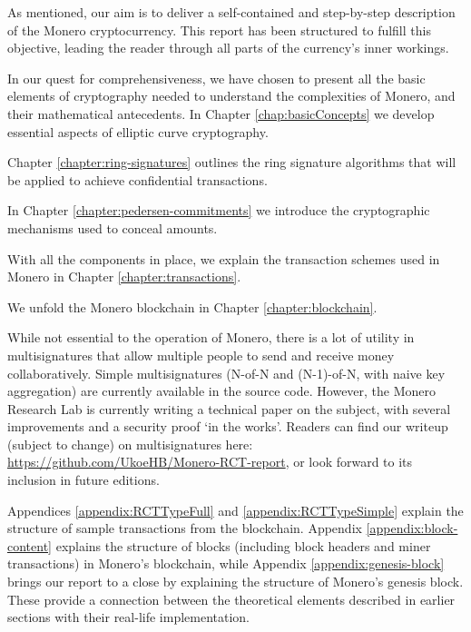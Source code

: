 As mentioned, our aim is to deliver a self-contained and step-by-step description of the Monero cryptocurrency. This report has been structured to fulfill this objective, leading the reader through all parts of the currency’s inner workings.

In our quest for comprehensiveness, we have chosen to present all the basic elements of cryptography needed to understand the complexities of Monero, and their mathematical antecedents. In Chapter \ref{chap:basicConcepts} we develop essential aspects of elliptic curve cryptography.

Chapter \ref{chapter:ring-signatures} outlines the ring signature algorithms that will be applied to achieve confidential transactions.

In Chapter \ref{chapter:pedersen-commitments} we introduce the cryptographic mechanisms used to conceal amounts.

With all the components in place, we explain the transaction schemes used in Monero in Chapter \ref{chapter:transactions}.

We unfold the Monero blockchain in Chapter \ref{chapter:blockchain}.

While not essential to the operation of Monero, there is a lot of utility in multisignatures that allow multiple people to send and receive money collaboratively. Simple multisignatures (N-of-N and (N-1)-of-N, with naive key aggregation) are currently available in the source code. However, the Monero Research Lab is currently writing a technical paper on the subject, with several improvements and a security proof `in the works'. Readers can find our writeup (subject to change) on multisignatures here: \url{https://github.com/UkoeHB/Monero-RCT-report}, or look forward to its inclusion in future editions. %

Appendices \ref{appendix:RCTTypeFull} and \ref{appendix:RCTTypeSimple} explain the structure of sample transactions from the blockchain. Appendix \ref{appendix:block-content} explains the structure of blocks (including block headers and miner transactions) in Monero's blockchain, while Appendix \ref{appendix:genesis-block} brings our report to a close by explaining the structure of Monero's genesis block. These provide a connection between the theoretical elements described in earlier sections with their real-life implementation.


